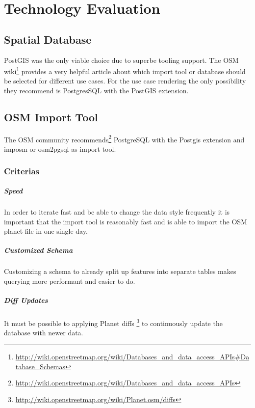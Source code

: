 \chapter{Technology Evaluation}\label{technology_evaluation}

\section{Spatial Database}\label{spatial_database}

PostGIS was the only viable choice due to superbe tooling support. The OSM wiki\footnote{\url{http://wiki.openstreetmap.org/wiki/Databases_and_data_access_APIs\#Database_Schemas}} provides a very helpful article about which import tool or database should be selected for different use cases. For the use case rendering the only possibility they recommend is PostgresSQL with the PostGIS extension. 

\section{OSM Import Tool}\label{osm_import_tool}
The OSM community
recommends\footnote{\url{http://wiki.openstreetmap.org/wiki/Databases_and_data_access_APIs}}
PostgreSQL with the Postgis extension and imposm or osm2pgsql as import tool.

\subsection{Criterias}\label{criterias}

\paragraph{Speed} 
In order to iterate fast and be able to change the data style frequently
it is important that the import tool is reasonably fast and is able
to import the OSM planet file in one single day.

\paragraph{Customized Schema}
Customizing a schema to already split up features into separate tables
makes querying more performant and easier to do.

\paragraph{Diff Updates}
It must be possible to applying Planet diffs \footnote{\url{http://wiki.openstreetmap.org/wiki/Planet.osm/diffs}} 
to continuously update the database with newer data.


